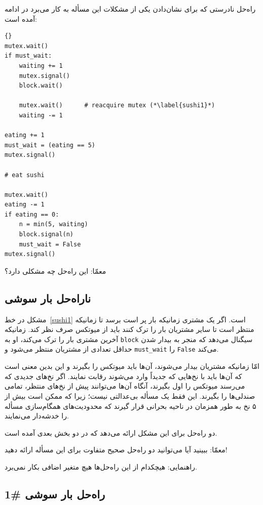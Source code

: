 \documentclass{book}
\newcommand{\clearemptydoublepage}{}%
\begin{document}
    راه‌حل نادرستی که  برای نشان‌دادن یکی از مشکلات این مسأله به کار می‌برد در ادامه آمده است: 

\begin{latin}
\begin{lstlisting}[title=\rl{ناراه‌حل بار سوشی}]{}
mutex.wait()
if must_wait:
    waiting += 1
    mutex.signal()
    block.wait()

    mutex.wait()      # reacquire mutex (*\label{sushi1}*)
    waiting -= 1

eating += 1
must_wait = (eating == 5)
mutex.signal()

# eat sushi

mutex.wait()
eating -= 1
if eating == 0:
    n = min(5, waiting)
    block.signal(n)
    must_wait = False
mutex.signal()
\end{lstlisting}
\end{latin}

    معمّا: این راه‌حل چه مشکلی دارد؟


\clearemptydoublepage
\subsection{ناراه‌حل بار سوشی}

    مشکل در خط~\ref{sushi1} است. اگر یک مشتری زمانیکه بار پر است برسد تا زمانیکه منتظر است تا سایر مشتریان بار را ترک کنند باید از میوتکس 
    صرف نظر کند. زمانیکه آخرین مشتری بار را ترک می‌کند، او به {\tt block} سیگنال می‌دهد که منجر به بیدار شدن حداقل تعدادی از مشتریان منتظر 
    می‌شود و {\tt must\_wait} را \texttt{False} می‌کند. 
    

    امّا زمانیکه مشتریان بیدار می‌شوند، آن‌ها باید میوتکس را بگیرند و این بدین معنی است که آن‌ها باید با نخ‌هایی که جدیداً وارد می‌شوند رقابت نمایند. 
    اگر نخ‌های جدیدی که می‌رسند میوتکس را اول بگیرند، آنگاه آن‌ها می‌توانند پیش از نخ‌های منتظر، تمامی صندلی‌ها را بگیرند. این فقط یک مسأله بی‌عدالتی
    نیست؛ زیرا که ممکن است بیش از ۵ نخ به طور همزمان در ناحیه بحرانی قرار گیرند که محدودیت‌های همگام‌سازی مسأله را خدشه‌دار می‌نمایند. 

    دو راه‌حل برای این مشکل ارائه می‌دهد که در دو بخش بعدی آمده است. 

    معمّا: ببینید آیا می‌توانید دو راه‌حل صحیح متفاوت برای این مسأله ارائه دهید!

    راهنمایی: هیچکدام از این راه‌حل‌ها هیچ متغیر اضافی بکار نمی‌برد. 

\clearemptydoublepage
\subsection{راه‌حل بار سوشی  \#1}
\end{document}
